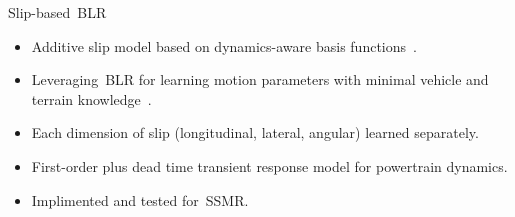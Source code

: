 \documentclass[final,hyperref={pdfpagelabels=false}]{beamer}
\begin{document}
\begin{frame}[t]
\begin{columns}[t]
\begin{column}{.465\textwidth}
\begin{block}{Slip-based~\acf{BLR}}
	
	\begin{itemize}
		\item Additive slip model based on dynamics-aware basis functions~\cite{Seegmiller2013}.
		\item Leveraging~\acf{BLR} for learning motion parameters with minimal vehicle and terrain knowledge~\cite{McKinnon2019}.
		\item Each dimension of slip (longitudinal, lateral, angular) learned separately.
		\item First-order plus dead time transient response model for powertrain dynamics.
		\item Implimented and tested for~\acf{SSMR}.
	\end{itemize}
	

\end{block}
\end{column}
\end{columns}
\end{frame}
\end{document}
